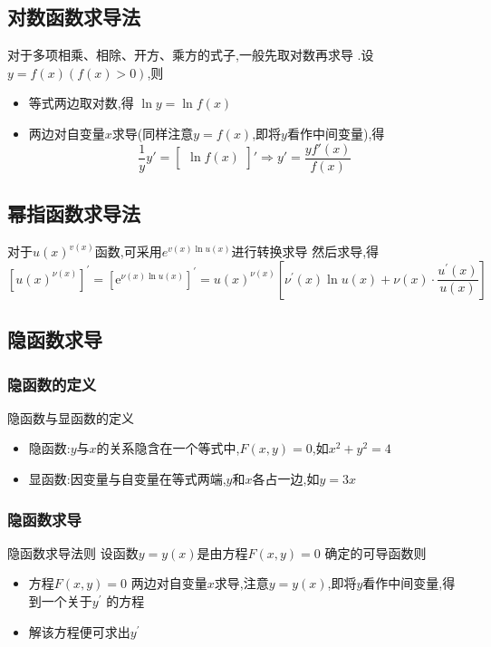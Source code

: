 \documentclass[8pt a4paper, oneside, UTF8]{ctexbook}  %
\begin{document}
\begin{sloppypar}
    \subsection{对数函数求导法}
    对于多项相乘、相除、开方、乘方的式子,一般先取对数再求导 .设$y=f(x)(f(x)>0)$,则
    \begin{itemize}
        \item 等式两边取对数,得 $\ln y=\ln f(x)$
        \item 两边对自变量$x$求导(同样注意$y=f(x)$,即将$y$看作中间变量),得
        $$
            \frac{1}{y}y'=\begin{bmatrix}\ln f(x)\end{bmatrix}'\Rightarrow y'=\frac{yf'(x)}{f(x)}\
        $$
    \end{itemize}
    \subsection{幂指函数求导法}
    对于$u(x)^{v(x)}$函数,可采用$e^{v(x)\ln u(x)}$进行转换求导
    然后求导,得
    $$
        \left[u(x)^{\nu(x)}\right]^{\prime}=\left[\mathrm{e}^{\nu(x)\ln u(x)}\right]^{\prime}=u(x)^{\nu(x)}\left[\nu^{\prime}(x)\ln u(x)+\nu(x)\cdot\frac{u^{\prime}(x)}{u(x)}\right]
    $$
    \subsection{隐函数求导}
    \subsubsection{隐函数的定义}
    \begin{defn}{隐函数与显函数的定义}{}
    \begin{itemize}
        \item 隐函数:$y$与$x$的关系隐含在一个等式中,$F(x,y)=0$,如$x^2+y^2=4$
        \item  显函数:因变量与自变量在等式两端,$y$和$x$各占一边,如$y=3x$​
    \end{itemize}
    \end{defn}
    \subsubsection{隐函数求导}
    \begin{defn}{隐函数求导法则}{}
        设函数$y=y(x)$是由方程$F(x,y)=0$ 确定的可导函数则
        \begin{itemize}
            \item 方程$F(x,y)=0$ 两边对自变量$x$求导,注意$y=y(x)$,即将$y$看作中间变量,得到一个关于$y^{\prime}$ 的方程
            \item 解该方程便可求出$y^{\prime}$
        \end{itemize}
    \end{defn}

\end{sloppypar}
\end{document}
